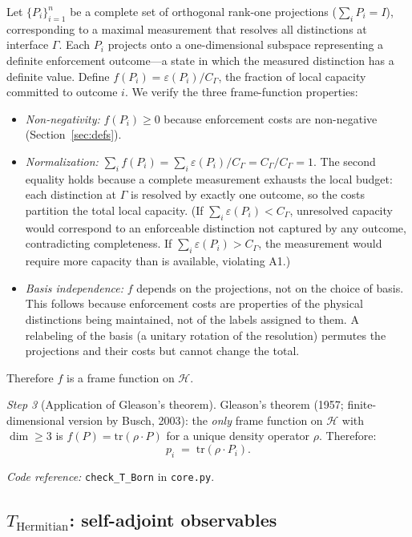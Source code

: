 \documentclass[11pt]{article}
\newenvironment{varlist}{\begin{itemize}[nosep,leftmargin=2em]}{\end{itemize}}
\newcommand{\coderef}[2]{\smallskip\noindent\textit{Code reference:} \texttt{#1} in \texttt{#2}.}
\begin{document}
\begin{tcolorbox}[apfbox, title={$T_{\mathrm{Born}}$: Born Rule from Admissibility Invariance}]
Let $\{P_i\}_{i=1}^n$ be a complete set of orthogonal rank-one projections ($\sum_i P_i = I$), corresponding to a maximal measurement that resolves all distinctions at interface $\Gamma$.  Each $P_i$ projects onto a one-dimensional subspace representing a definite enforcement outcome---a state in which the measured distinction has a definite value.  Define $f(P_i) = \varepsilon(P_i) / C_\Gamma$, the fraction of local capacity committed to outcome $i$.  We verify the three frame-function properties:
\begin{varlist}
\item \textit{Non-negativity:} $f(P_i) \ge 0$ because enforcement costs are non-negative (Section~\ref{sec:defs}).
\item \textit{Normalization:} $\sum_i f(P_i) = \sum_i \varepsilon(P_i)/C_\Gamma = C_\Gamma/C_\Gamma = 1$.  The second equality holds because a complete measurement exhausts the local budget: each distinction at $\Gamma$ is resolved by exactly one outcome, so the costs partition the total local capacity.  (If $\sum_i \varepsilon(P_i) < C_\Gamma$, unresolved capacity would correspond to an enforceable distinction not captured by any outcome, contradicting completeness.  If $\sum_i \varepsilon(P_i) > C_\Gamma$, the measurement would require more capacity than is available, violating A1.)
\item \textit{Basis independence:} $f$ depends on the projections, not on the choice of basis.  This follows because enforcement costs are properties of the physical distinctions being maintained, not of the labels assigned to them.  A relabeling of the basis (a unitary rotation of the resolution) permutes the projections and their costs but cannot change the total.
\end{varlist}
Therefore $f$ is a frame function on $\mathcal{H}$.

\textit{Step 3} (Application of Gleason's theorem).  Gleason's theorem (1957; finite-dimensional version by Busch, 2003): the \emph{only} frame function on $\mathcal{H}$ with $\dim \ge 3$ is $f(P) = \mathrm{tr}(\rho \cdot P)$ for a unique density operator $\rho$.  Therefore:
\begin{equation}
p_i \;=\; \mathrm{tr}(\rho \cdot P_i).
\end{equation}

\coderef{check\_T\_Born}{core.py}
\end{tcolorbox}


\subsection{\texorpdfstring{$T_{\mathrm{Hermitian}}$}{T Hermitian}: self-adjoint observables}
\end{document}
